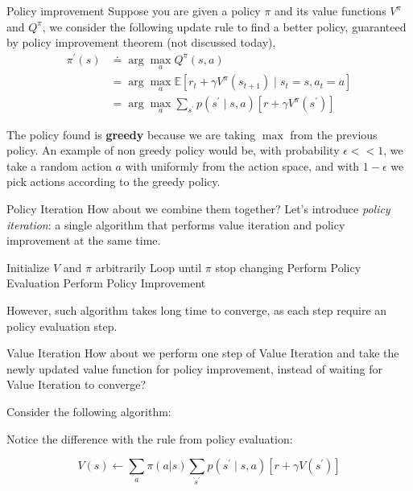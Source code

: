 \documentclass[handout]{beamer}
\begin{document}
\begin{frame}{Policy improvement}
\small
    Suppose you are given a policy $\pi$ and its value functions $V^{\pi}$ and $Q^{\pi}$, we consider the following update rule to find a better policy, guaranteed by policy improvement theorem (not discussed today), 
    \begin{equation*}
    \begin{aligned}
    \pi^{\prime}(s) & \doteq  \arg \max_{a} Q^{\pi}(s, a) \\
    &=\arg \max_{a} \mathbb{E}\left[r_{t}+\gamma V^{\pi}\left(s_{t+1}\right) \mid s_{t}=s, a_{t}=a\right] \\
    &=\arg \max_{a} \sum_{s^{\prime}} p\left(s^{\prime} \mid s, a\right)\left[r+\gamma V^{\pi}\left(s^{\prime}\right)\right]
    \end{aligned}
    \end{equation*}

    The policy found is \textbf{greedy} because we are taking $\max$ from the previous policy. An example of non greedy policy would be, with probability $\epsilon << 1$, we take a random action $a$ with uniformly from the action space, and with $1-\epsilon$ we pick actions according to the greedy policy.
\end{frame}

\begin{frame}{Policy Iteration}
How about we combine them together? Let's introduce \textit{policy iteration}: a single algorithm that performs value iteration and policy improvement at the same time.
\begin{algorithm}[H]
\caption{Policy Iteration}
Initialize $V$ and $\pi$ arbitrarily\;
Loop until $\pi$ stop changing\;
\quad Perform Policy Evaluation\;
\quad Perform Policy Improvement\;
\end{algorithm}
However, such algorithm takes long time to converge, as each step require an policy evaluation step. 
\end{frame}

\begin{frame}{Value Iteration}
\small
    How about we perform one step of Value Iteration and take the newly updated value function for policy improvement, instead of waiting for Value Iteration to converge?

    Consider the following algorithm:
\begin{algorithm}[H]
\caption{Value Iteration}
\end{algorithm}
Notice the difference with the rule from policy evaluation:

\color{red}
$$
V(s) \leftarrow \sum_a \pi(a|s) \sum_{s^{\prime}} p\left(s^{\prime} \mid s, a\right)\left[r+\gamma V\left(s^{\prime}\right)\right]
$$
\end{frame}
\end{document}
